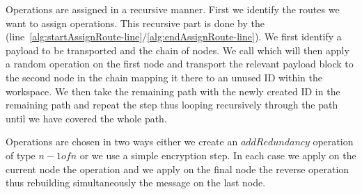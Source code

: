 Operations are assigned in a recursive manner. First we identify the routes we want to assign operations. This recursive part is done by the  (line~\ref{alg:startAssignRoute-line}\-/\ref{alg:endAssignRoute-line}). We first identify a payload to be transported and the chain of nodes. We call  which will then apply a random operation on the first node and transport the relevant payload block to the second node in the chain mapping it there to an unused ID within the workspace. We then take the remaining path with the newly created ID in the remaining path and repeat the step thus looping recursively through the path until we have covered the whole path.

Operations are chosen in two ways either we create an $addRedundancy$ operation of type $n-1 of n$ or we use a simple encryption step. In each case we apply on the current node the operation and we apply on the final node the reverse operation thus rebuilding simultaneously the message on the last node.


